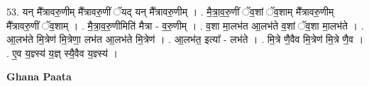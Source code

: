 \documentclass[17pt]{extarticle}
\begin{document}
53. यन् मै᳚त्रावरु॒णीम् मै᳚त्रावरु॒णीं ॅयद् यन् मै᳚त्रावरु॒णीम् । . मै॒त्रा॒व॒रु॒णीं ॅव॒शां ॅव॒शाम् मै᳚त्रावरु॒णीम् मै᳚त्रावरु॒णीं ॅव॒शाम् । . मै॒त्रा॒व॒रु॒णीमिति॑ मैत्रा - व॒रु॒णीम् । . व॒शा मा॒लभ॑त आ॒लभ॑ते व॒शां ॅव॒शा मा॒लभ॑ते । . आ॒लभ॑ते मि॒त्रेण॑ मि॒त्रेणा॒ लभ॑त आ॒लभ॑ते मि॒त्रेण॑ । . आ॒लभ॑त॒ इत्या᳚ - लभ॑ते । . मि॒त्रे णै॒वैव मि॒त्रेण॑ मि॒त्रे णै॒व । . ए॒व य॒ज्ञ्स्य॑ य॒ज्ञ् स्यै॒वैव य॒ज्ञ्स्य॑ । \newline

\textbf{Ghana Paata } \newline
\end{document}
